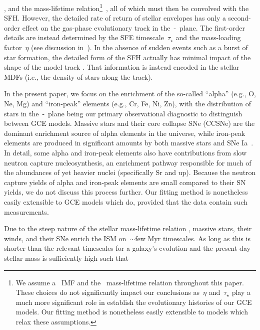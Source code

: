 \documentclass[ms.tex]{subfiles}
\begin{document}
\citep[e.g.,][]{Kalirai2008}, and the mass-lifetime relation\footnote{
	We assume a~\citet{Kroupa2001} IMF and the~\citet{Larson1974} mass-lifetime
	relation throughout this paper.
	These choices do not significantly impact our conclusions as~$\eta$
	and~$\tau_\star$ play a much more significant role in establish the
	evolutionary histories of our GCE models.
	Our fitting method is nonetheless easily extensible to models which relax
	these assumptions.
}~\citep*[e.g.,][]{Larson1974, Maeder1989, Hurley2000}, all of which must then
be convolved with the SFH.
However, the detailed rate of return of stellar envelopes has only a
second-order effect on the gas-phase evolutionary track in the~\afe-\feh~plane.
The first-order details are instead determined by the SFE timescale~$\tau_\star$
and the mass-loading factor~$\eta$ (see discussion in~\citealt{Weinberg2017}).
In the absence of sudden events such as a burst of star formation, the detailed
form of the SFH actually has minimal impact of the shape of the model track
\citep{Weinberg2017, Johnson2020}.
That information is instead encoded in the stellar MDFs (i.e., the density of
stars along the track).
\par
In the present paper, we focus on the enrichment of the so-called ``alpha''
(e.g., O, Ne, Mg) and ``iron-peak'' elements (e.g., Cr, Fe, Ni, Zn), with the
distribution of stars in the~\afe-\feh~plane being our primary observational
diagnostic to distinguish between GCE models.
Massive stars and their core collapse SNe (CCSNe) are the dominant enrichment
source of alpha elements in the universe, while iron-peak elements are produced
in significant amounts by both massive stars and SNe Ia~\citep[e.g.,][]{Johnson2019}.
In detail, some alpha and iron-peak elements also have contributions from slow
neutron capture nucleosynthesis, an enrichment pathway responsible for much of
the abundances of yet heavier nuclei (specifically Sr and up).
Because the neutron capture yields of alpha and iron-peak elements are
small compared to their SN yields, we do not discuss this process further.
Our fitting method is nonetheless easily extensible to GCE models which do,
provided that the data contain such measurements.
\par
Due to the steep nature of the stellar mass-lifetime relation
\citep[e.g.,][]{Larson1974, Maeder1989, Hurley2000}, massive stars, their winds,
and their SNe enrich the ISM on~$\sim$few Myr timescales.
As long as this is shorter than the relevant timescales for a galaxy's
evolution and the present-day stellar mass is sufficiently high such that
\end{document}
